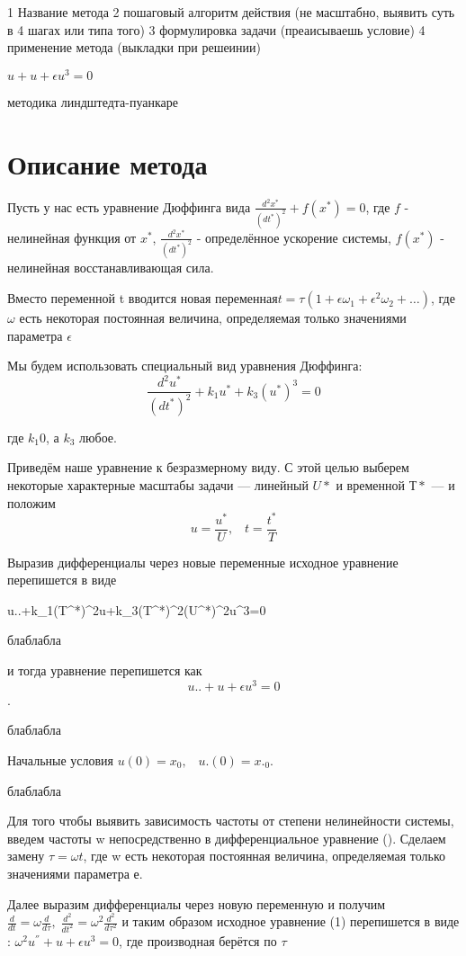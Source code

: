 \documentclass[bachelor, och, coursework, times]{SCWorks}
\begin{document}

1 Название метода
2 пошаговый алгоритм действия (не масштабно, выявить суть в 4 шагах или типа того)
3 формулировка задачи (преаисываешь условие)
4 применение метода (выкладки при решеинии)


$u+u+\epsilon u^3=0$


методика линдштедта-пуанкаре

\section{Описание метода}

Пусть у нас есть уравнение Дюффинга вида $\frac{d^2x^*}{(dt^*)^2}+f(x^*)=0$, где $f$ - нелинейная функция от $x^*$, $\frac{d^2x^*}{(dt^*)^2}$ - определённое ускорение системы, $f(x^*)$ - нелинейная восстанавливающая сила.

 Вместо переменной t вводится новая переменная$t=\tau(1+\epsilon\omega_1+\epsilon^2\omega_2+\ldots)$, где $\omega$ есть некоторая постоянная величина, определяемая только значениями параметра $\epsilon$ 

Мы будем использовать специальный вид уравнения Дюффинга:
$$\frac{d^2u^*}{(dt^*)^2}+k_1u^*+k_3(u^*)^3=0 $$

где $k_1 0 $, а $k_3$ любое.

Приведём наше уравнение к безразмерному виду. С этой целью выберем некоторые характерные масштабы задачи — линейный $U*$ и временной $Т*$ — и положим
$$ u = \frac{u^*}{U}, \; \; \; t = \frac{t^*}{T} $$


Выразив дифференциалы   через новые переменные исходное уравнение перепишется в виде

u..+k_1(T^*)^2u+k_3(T^*)^2(U^*)^2u^3=0

блаблабла

и тогда уравнение перепишется как $$u..+u+\epsilon u^3=0$$.

блаблабла

Начальные условия $u(0)=x_0, \; \; \; u.(0)=x._0$.

блаблабла

\newpage

Для того чтобы выявить зависимость частоты от степени нелинейности системы, введем частоты w непосредственно в дифференциальное уравнение (). 
Сделаем замену $\tau=\omega t$, где w есть некоторая постоянная величина, определяемая только значениями параметра е.

Далее выразим дифференциалы через новую переменную и получим
$\frac{d}{dt} = \omega \frac{d}{d\tau} , \; \frac{d^2}{dt^2} = \omega^2 \frac{d^2}{d\tau^2}$ и таким образом исходное уравнение (1) перепишется в виде : $\omega^2u^{''}+u+\epsilon u^3=0$, где производная берётся по $\tau$
\end{document}
